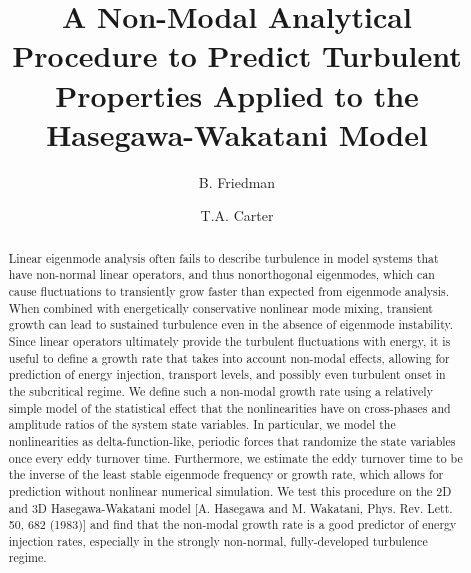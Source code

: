\documentclass[twocolumn,showkeys,superscriptaddress]{revtex4}
\begin{document}
\title{A Non-Modal Analytical Procedure to Predict Turbulent Properties Applied to the Hasegawa-Wakatani Model}

\author{B. Friedman}



\author{T.A. Carter}




\begin{abstract}
Linear eigenmode analysis often fails to describe turbulence in model
systems that have non-normal linear operators, and thus
nonorthogonal eigenmodes, which can cause fluctuations to transiently grow faster than expected from eigenmode analysis. When combined with energetically conservative nonlinear mode mixing, 
transient growth can lead to sustained turbulence even in the absence of eigenmode instability. 
Since linear operators ultimately provide the turbulent fluctuations with energy, it is useful to define a growth rate that takes into account non-modal effects, allowing for
prediction of energy injection, transport levels, and possibly even turbulent onset in the subcritical regime. 
We define such a non-modal growth rate using a relatively simple model
of the statistical effect that the nonlinearities have on cross-phases and amplitude ratios of the system state variables. 
In particular, we model the nonlinearities as delta-function-like, periodic forces that randomize the state variables once every eddy turnover time. Furthermore, we estimate the eddy turnover
time to be the inverse of the least stable eigenmode frequency or growth rate, which allows for prediction without nonlinear numerical simulation. 
We test this procedure on the 2D and 3D Hasegawa-Wakatani model [A. Hasegawa and M. Wakatani, Phys. Rev. Lett. 50, 682 (1983)] and find that
the non-modal growth rate is a good predictor of energy injection rates, especially in the strongly non-normal, fully-developed turbulence regime.
\end{abstract}

\maketitle
\end{document}
